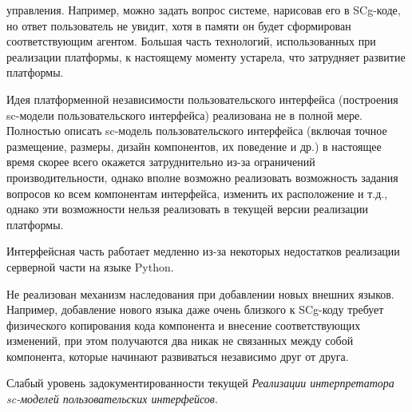 \begin{scnitemize}
\begin{scnitemize}
\begin{scnitemize}
    управления. Например, можно задать вопрос системе, нарисовав его в SCg-коде, но ответ пользователь не увидит, хотя
    в памяти он будет сформирован соответствующим агентом. Большая часть технологий, использованных при реализации
    платформы, к настоящему моменту устарела, что затрудняет развитие платформы.
    \item Идея платформенной независимости пользовательского интерфейса (построения sc-модели пользовательского
    интерфейса) реализована не в полной мере. Полностью описать sc-модель пользовательского интерфейса (включая точное
    размещение, размеры, дизайн компонентов, их поведение и др.) в настоящее время скорее всего окажется затруднительно
    из-за ограничений производительности, однако вполне возможно реализовать возможность задания вопросов ко всем
    компонентам интерфейса, изменить их расположение и т.д., однако эти возможности нельзя реализовать в текущей
    версии реализации платформы.
    \item Интерфейсная часть работает медленно из-за некоторых недостатков реализации серверной части на языке Python.
    \item Не реализован механизм наследования при добавлении новых внешних языков. Например, добавление нового языка
    даже очень близкого к SCg-коду требует физического копирования кода компонента и внесение соответствующих изменений,
    при этом получаются два никак не связанных между собой компонента, которые начинают развиваться независимо друг от
    друга.
    \item Слабый уровень задокументированности текущей \textit{Реализации интерпретатора sc-моделей пользовательских
    интерфейсов}.
\end{scnitemize}


\end{scnitemize}
\end{scnitemize}
